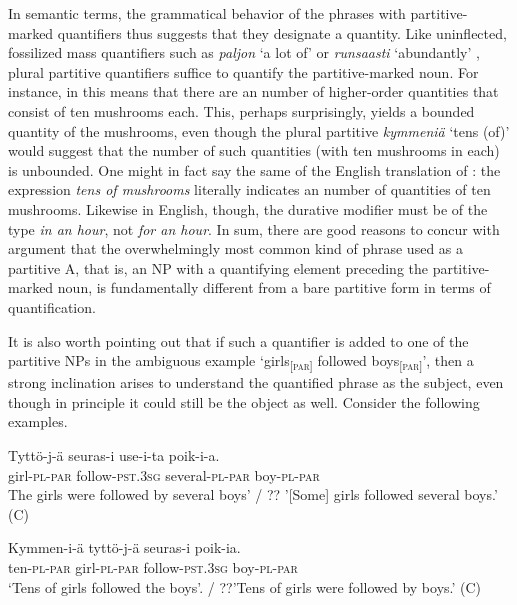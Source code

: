 \documentclass[output=paper]{LSP/langsci}
\begin{document}
In semantic terms, the grammatical behavior of the phrases with partitive-marked quantifiers thus suggests that they designate a  quantity. Like uninflected, fossilized mass quantifiers such as \textit{paljon} ‘a lot of’  or \textit{runsaasti} ‘abundantly’ , plural partitive quantifiers suffice to quantify the partitive-marked noun. For instance, in  this means that there are an  number of higher-order quantities that consist of ten mushrooms each. This, perhaps surprisingly, yields a bounded quantity of the mushrooms, even though the plural partitive \textit{kymmeniä} ‘tens (of)’ would suggest that the number of such quantities (with ten mushrooms in each) is unbounded. One might in fact say the same of the English translation of : the expression \textit{tens of mushrooms} literally indicates an  number of quantities of ten mushrooms. Likewise in English, though, the durative modifier must be of the type \textit{in an hour}, not \textit{for an hour}. In sum, there are good reasons to concur with  argument that the overwhelmingly most common kind of phrase used as a partitive A, that is, an NP with a quantifying element preceding the partitive-marked noun, is fundamentally different from a bare partitive form in terms of quantification. 

It is also worth pointing out that if such a quantifier is added to one of the partitive NPs in the ambiguous example  ‘girls\textsc{\textsubscript{[par]}} followed boys\textsc{\textsubscript{[par]}}’, then a strong inclination arises to understand the quantified phrase as the subject, even though in principle it could still be the object as well. Consider the following examples.

\ea%
\label{15-hu-ex:45}

\gll Tyttö-j-ä seuras-i use-i-ta poik-i-a.\\
girl-\textsc{pl}-\textsc{par} follow-\textsc{pst}.\textsc{3sg} several-\textsc{pl}-\textsc{par} boy-\textsc{pl}-\textsc{par}\\
\glt The girls were followed by several boys’ / ?? ’[Some] girls followed several boys.’  (C)
\z

\ea%
\label{15-hu-ex:46}

\gll Kymmen-i-ä tyttö-j-ä seuras-i poik-ia.\\
ten-\textsc{pl}-\textsc{par} girl-\textsc{pl}-\textsc{par} follow-\textsc{pst}.\textsc{3sg} boy-\textsc{pl}-\textsc{par}\\
\glt ‘Tens of girls followed the boys’. / ??’Tens of girls were followed by boys.’  (C)
\z
\end{document}

